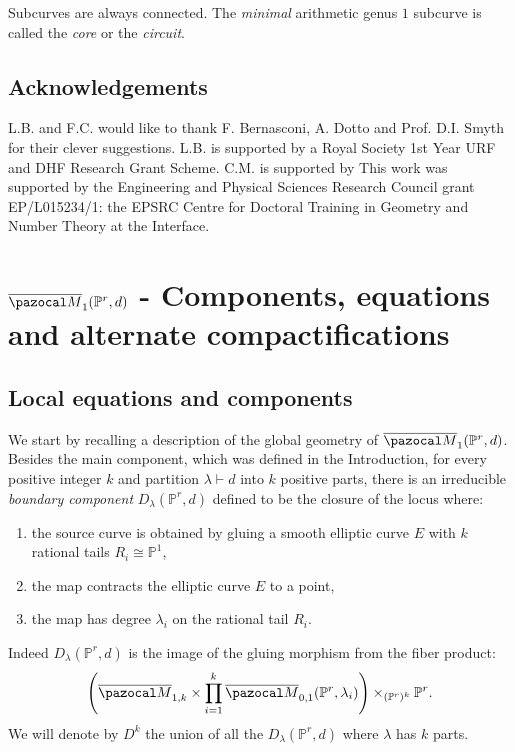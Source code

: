 \documentclass[11pt]{amsart}
\newcommand{\M}[4]{\overline{\pazocal M}_{#1,#2}(#3,#4)}
\newcommand{\PP}{\mathbb P}
\newcommand{\oM}{\overline{\pazocal M}}
\theoremstyle{plain}
\theoremstyle{definition}
\begin{document}
Subcurves are always connected.
 The \emph{minimal} arithmetic genus $1$ subcurve is called the \emph{core} or the \emph{circuit}.

\subsection*{Acknowledgements}
L.B. and F.C. would like to thank F. Bernasconi, A. Dotto and Prof. D.I. Smyth for their clever suggestions.
L.B. is supported by a Royal Society 1st Year URF and DHF Research Grant Scheme.
C.M. is supported by 
This work was supported by the Engineering and Physical Sciences Research Council grant EP/L015234/1: the EPSRC Centre for Doctoral Training in Geometry and Number Theory at the Interface.


\section{$\oM_1(\PP^r,d)$ - Components, equations  and alternate compactifications}\label{sec:section1}

\subsection{Local equations and components}
We start by recalling a description of the global geometry of $\oM_1(\PP^r,d)$. Besides the main component, which was defined in the Introduction, for every positive integer $k$ and partition $\lambda\vdash d$ into $k$ positive parts, there is an irreducible \emph{boundary component} $D_{\lambda}(\PP^r,d)$ defined to be the closure of the locus where:
\begin{enumerate}[label=(\roman*)]
\item the source curve is obtained by gluing a smooth elliptic curve $E$ with $k$  rational tails $R_i\cong\PP^1$,
\item the map contracts the elliptic curve $E$ to a point, 
\item the map has degree $\lambda_i$ on the rational tail $R_i$.
\end{enumerate}
Indeed $D_{\lambda}(\PP^r,d)$ is the image of the gluing morphism from the fiber product:
\[\left(\oM_{1,k}\times\prod_{i=1}^k\M{0}{1}{\PP^r}{\lambda_i}\right)\times_{(\PP^r)^k}\PP^r.\]
We will denote by $D^k$ the union of all the $D_{\lambda}(\PP^r,d)$ where $\lambda$ has $k$ parts.
\end{document}
